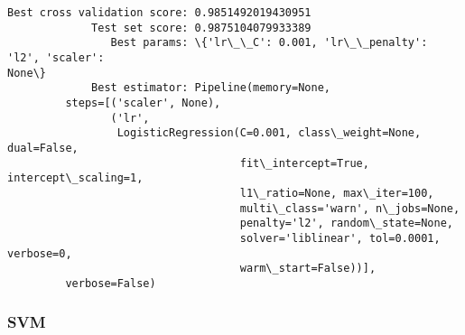 \documentclass[11pt]{article}
\begin{document}
    \begin{Verbatim}[commandchars=\\\{\}]
Best cross validation score: 0.9851492019430951
             Test set score: 0.9875104079933389
                Best params: \{'lr\_\_C': 0.001, 'lr\_\_penalty': 'l2', 'scaler':
None\}
             Best estimator: Pipeline(memory=None,
         steps=[('scaler', None),
                ('lr',
                 LogisticRegression(C=0.001, class\_weight=None, dual=False,
                                    fit\_intercept=True, intercept\_scaling=1,
                                    l1\_ratio=None, max\_iter=100,
                                    multi\_class='warn', n\_jobs=None,
                                    penalty='l2', random\_state=None,
                                    solver='liblinear', tol=0.0001, verbose=0,
                                    warm\_start=False))],
         verbose=False)
\end{Verbatim}

    \hypertarget{svm}{%
\subsubsection{SVM}\label{svm}}
\end{document}
